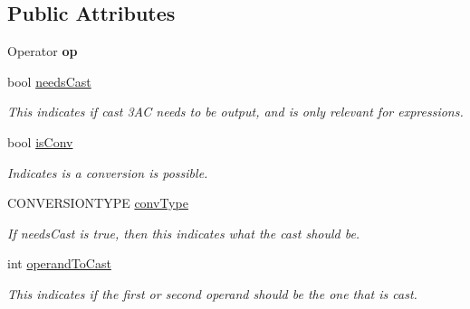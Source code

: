 \subsection*{Public Attributes}
\begin{DoxyCompactItemize}
\item 
\hypertarget{classAstAssignOp_a0c44cf716e74593ce0e303972dd79cf4}{Operator {\bfseries op}}\label{classAstAssignOp_a0c44cf716e74593ce0e303972dd79cf4}

\item 
\hypertarget{classAST_aaf215802de409f8096c063d01ffa6783}{bool \hyperlink{classAST_aaf215802de409f8096c063d01ffa6783}{needs\-Cast}}\label{classAST_aaf215802de409f8096c063d01ffa6783}

\begin{DoxyCompactList}\small\item\em This indicates if cast 3\-A\-C needs to be output, and is only relevant for expressions. \end{DoxyCompactList}\item 
\hypertarget{classAST_afa9e77ef650ec6664458fa6cb55be985}{bool \hyperlink{classAST_afa9e77ef650ec6664458fa6cb55be985}{is\-Conv}}\label{classAST_afa9e77ef650ec6664458fa6cb55be985}

\begin{DoxyCompactList}\small\item\em Indicates is a conversion is possible. \end{DoxyCompactList}\item 
\hypertarget{classAST_a61ef3317e023d45237e06615b387cd6b}{C\-O\-N\-V\-E\-R\-S\-I\-O\-N\-T\-Y\-P\-E \hyperlink{classAST_a61ef3317e023d45237e06615b387cd6b}{conv\-Type}}\label{classAST_a61ef3317e023d45237e06615b387cd6b}

\begin{DoxyCompactList}\small\item\em If needs\-Cast is true, then this indicates what the cast should be. \end{DoxyCompactList}\item 
\hypertarget{classAST_aea9b07b39d24183f38c0029cec0a878e}{int \hyperlink{classAST_aea9b07b39d24183f38c0029cec0a878e}{operand\-To\-Cast}}\label{classAST_aea9b07b39d24183f38c0029cec0a878e}

\begin{DoxyCompactList}\small\item\em This indicates if the first or second operand should be the one that is cast. \end{DoxyCompactList}\end{DoxyCompactItemize}
